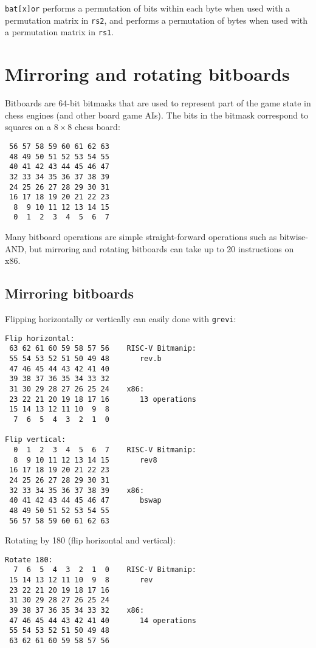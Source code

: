 {\tt bat[x]or} performs a permutation of bits within each byte when used with a
permutation matrix in {\tt rs2}, and performs a permutation of bytes when used
with a permutation matrix in {\tt rs1}.


\section{Mirroring and rotating bitboards}

Bitboards are 64-bit bitmasks that are used to represent part of the game state
in chess engines (and other board game AIs). The bits in the bitmask correspond
to squares on a $8 \times 8$ chess board:

\begin{verbatim}
 56 57 58 59 60 61 62 63
 48 49 50 51 52 53 54 55
 40 41 42 43 44 45 46 47
 32 33 34 35 36 37 38 39
 24 25 26 27 28 29 30 31
 16 17 18 19 20 21 22 23
  8  9 10 11 12 13 14 15
  0  1  2  3  4  5  6  7
\end{verbatim}

Many bitboard operations are simple straight-forward operations such as
bitwise-AND, but mirroring and rotating bitboards can take up to 20
instructions on x86.

\subsection{Mirroring bitboards}

Flipping horizontally or vertically can easily done with {\tt grevi}:

\begin{verbatim}
Flip horizontal:
 63 62 61 60 59 58 57 56    RISC-V Bitmanip:
 55 54 53 52 51 50 49 48       rev.b
 47 46 45 44 43 42 41 40
 39 38 37 36 35 34 33 32
 31 30 29 28 27 26 25 24    x86:
 23 22 21 20 19 18 17 16       13 operations
 15 14 13 12 11 10  9  8
  7  6  5  4  3  2  1  0

Flip vertical:
  0  1  2  3  4  5  6  7    RISC-V Bitmanip:
  8  9 10 11 12 13 14 15       rev8
 16 17 18 19 20 21 22 23
 24 25 26 27 28 29 30 31
 32 33 34 35 36 37 38 39    x86:
 40 41 42 43 44 45 46 47       bswap
 48 49 50 51 52 53 54 55
 56 57 58 59 60 61 62 63
\end{verbatim}

Rotating by 180 (flip horizontal and vertical):

\begin{verbatim}
Rotate 180:
  7  6  5  4  3  2  1  0    RISC-V Bitmanip:
 15 14 13 12 11 10  9  8       rev
 23 22 21 20 19 18 17 16
 31 30 29 28 27 26 25 24
 39 38 37 36 35 34 33 32    x86:
 47 46 45 44 43 42 41 40       14 operations
 55 54 53 52 51 50 49 48
 63 62 61 60 59 58 57 56
\end{verbatim}

